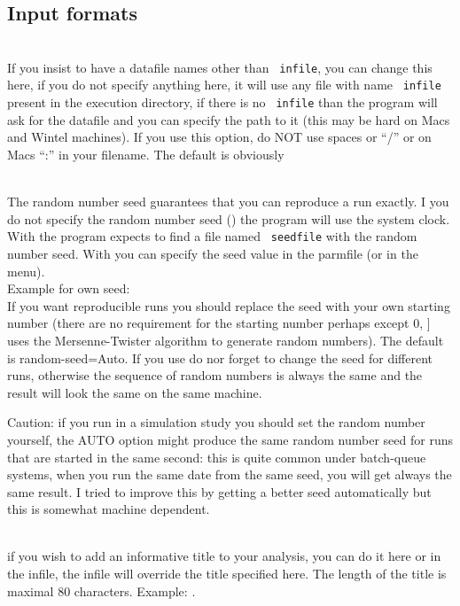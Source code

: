 \subsection{Input formats}
\begin{description}
\item{}\\
If you insist to have a datafile names other than \texttt{ infile}, you can change
this here, if you do not specify anything here, it will use any file
with name \texttt{ infile} present in the execution directory, if there is no
\texttt{ infile} than the program will ask for the datafile and 
you can specify the path to it (this may be hard on Macs and Wintel machines). 
If you use this option, do {\bt NOT} use spaces  or ``/'' or on Macs ``:''
in your filename. The default is obviously {}

\item {}\\
The random number seed guarantees that you can reproduce a run
exactly. I you do not specify the random number seed ()
the program will use the system clock. With {} the program expects to find a file named \texttt{ seedfile} with the random number seed.
With {} you can specify the seed value in the parmfile
(or in the menu). \\
Example for own seed:\\
If you want reproducible runs you should replace the {} seed with your own starting number (there are no requirement for the starting number perhaps except 0, ] \migrate uses the Mersenne-Twister algorithm to generate random numbers). 
The default is {\bt random-seed=Auto}. If you use
 {} do nor forget to change the seed for different runs,
otherwise the sequence of random numbers is always the same and the result will look the same on the same machine. 

Caution: if you run \migrate in a simulation study you should set the random number yourself, the AUTO option might produce the same random number seed for runs that are started in the same second: this is quite common under batch-queue systems, when you run the same date from the same seed, you will get always the same result. I tried to improve this by getting a better seed automatically but this is somewhat machine dependent.

\item{}\\
if you wish to add an informative title to your analysis,
you can do it here or in the infile, the infile will override
the title specified here. The length of the title is maximal 80 characters.
Example: {}.
\end{description}

